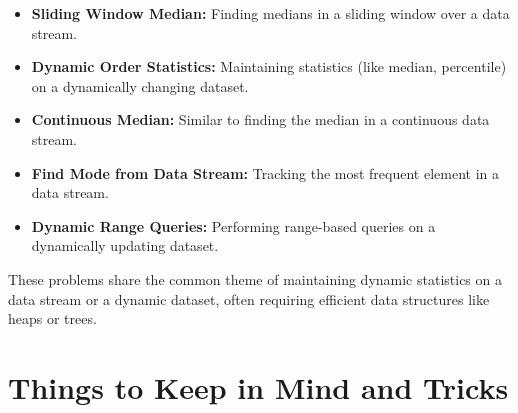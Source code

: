 \begin{itemize}
    \item \textbf{Sliding Window Median:} Finding medians in a sliding window over a data stream.
    
    \item \textbf{Dynamic Order Statistics:} Maintaining statistics (like median, percentile) on a dynamically changing dataset.
    
    \item \textbf{Continuous Median:} Similar to finding the median in a continuous data stream.
    
    \item \textbf{Find Mode from Data Stream:} Tracking the most frequent element in a data stream.
    
    \item \textbf{Dynamic Range Queries:} Performing range-based queries on a dynamically updating dataset.
\end{itemize}

These problems share the common theme of maintaining dynamic statistics on a data stream or a dynamic dataset, often requiring efficient data structures like heaps or trees.

\section*{Things to Keep in Mind and Tricks}

